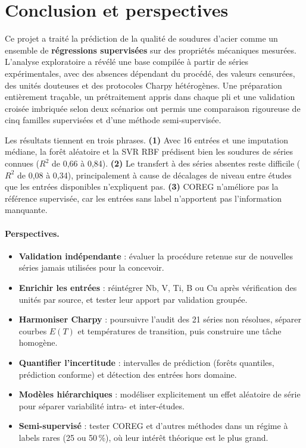 \section{Conclusion et perspectives}
\label{sec:conclusion}

Ce projet a traité la prédiction de la qualité de soudures d'acier comme un
ensemble de \textbf{régressions supervisées} sur des propriétés mécaniques
mesurées. L'analyse exploratoire a révélé une base compilée à partir de séries
expérimentales, avec des absences dépendant du procédé, des valeurs censurées,
des unités douteuses et des protocoles Charpy hétérogènes. Une préparation
entièrement traçable, un prétraitement appris dans chaque pli et une validation
croisée imbriquée selon deux scénarios ont permis une comparaison rigoureuse de
cinq familles supervisées et d'une méthode semi-supervisée.

Les résultats tiennent en trois phrases. \textbf{(1)} Avec 16 entrées et une
imputation médiane, la forêt aléatoire et la SVR RBF prédisent bien les soudures
de séries connues ($R^2$ de 0,66 à 0,84). \textbf{(2)} Le transfert à des séries
absentes reste difficile ($R^2$ de 0,08 à 0,34), principalement à cause de
décalages de niveau entre études que les entrées disponibles n'expliquent pas.
\textbf{(3)} COREG n'améliore pas la référence supervisée, car les entrées sans
label n'apportent pas l'information manquante.

\paragraph{Perspectives.}
\begin{itemize}
  \item \textbf{Validation indépendante} : évaluer la procédure retenue sur de nouvelles séries jamais utilisées pour la concevoir.
  \item \textbf{Enrichir les entrées} : réintégrer Nb, V, Ti, B ou Cu après vérification des unités par source, et tester leur apport par validation groupée.
  \item \textbf{Harmoniser Charpy} : poursuivre l'audit des 21 séries non résolues, séparer courbes $E(T)$ et températures de transition, puis construire une tâche homogène.
  \item \textbf{Quantifier l'incertitude} : intervalles de prédiction (forêts quantiles, prédiction conforme) et détection des entrées hors domaine.
  \item \textbf{Modèles hiérarchiques} : modéliser explicitement un effet aléatoire de série pour séparer variabilité intra- et inter-études.
  \item \textbf{Semi-supervisé} : tester COREG et d'autres méthodes dans un régime à labels rares (25 ou 50\,\%), où leur intérêt théorique est le plus grand.
\end{itemize}
